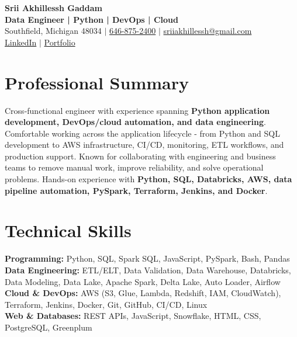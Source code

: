 \documentclass[letterpaper,10pt]{article}
\begin{document}
\fontsize{9.35pt}{10.45pt}\selectfont

\begin{center}
    {\LARGE \textbf{Srii Akhillessh Gaddam}} \\[-1pt]
    \textbf{Data Engineer | Python | DevOps | Cloud} \\[2pt]
    Southfield, Michigan 48034 $|$
    \href{tel:6468752400}{646-875-2400} $|$
    \href{mailto:sriiakhillessh@gmail.com}{sriiakhillessh@gmail.com} \\[1pt]
    \href{https://www.linkedin.com/in/srii-akhiilessh-gaddam-b48668191/}{LinkedIn} $|$
    \href{https://sriiakhillesshg.github.io/portfolio/}{Portfolio}
\end{center}
\vspace{-8pt}

\section{Professional Summary}
\small{Cross-functional engineer with experience spanning \textbf{Python application development, DevOps/cloud automation, and data engineering}. Comfortable working across the application lifecycle - from Python and SQL development to AWS infrastructure, CI/CD, monitoring, ETL workflows, and production support. Known for collaborating with engineering and business teams to remove manual work, improve reliability, and solve operational problems. Hands-on experience with \textbf{Python, SQL, Databricks, AWS, data pipeline automation, PySpark, Terraform, Jenkins, and Docker}.}

\section{Technical Skills}
\small{
\textbf{Programming:} Python, SQL, Spark SQL, JavaScript, PySpark, Bash, Pandas \\
\textbf{Data Engineering:} ETL/ELT, Data Validation, Data Warehouse, Databricks, Data Modeling, Data Lake, Apache Spark, Delta Lake, Auto Loader, Airflow \\
\textbf{Cloud \& DevOps:} AWS (S3, Glue, Lambda, Redshift, IAM, CloudWatch), Terraform, Jenkins, Docker, Git, GitHub, CI/CD, Linux \\
\textbf{Web \& Databases:} REST APIs, JavaScript, Snowflake, HTML, CSS, PostgreSQL, Greenplum
}
\end{document}
